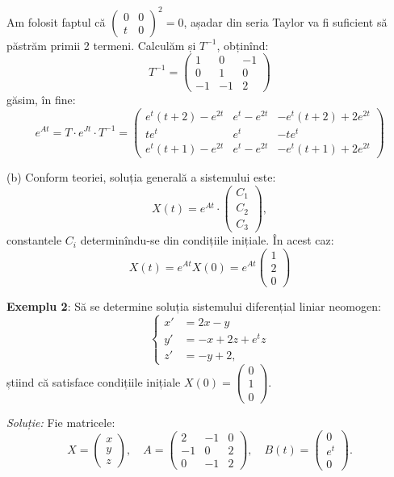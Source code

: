 \documentclass[11pt,a4paper]{article}
\theoremstyle{dotless}
\theoremstyle{dotlessdr}
\begin{document}
Am folosit faptul că $\begin{pmatrix} 0 & 0 \\ t & 0 \end{pmatrix}^2 = 0$, așadar
din seria Taylor va fi suficient să păstrăm primii 2 termeni. Calculăm și $T^{-1}$,
obținînd:
\[
  T^{-1} = \begin{pmatrix}
    1 & 0 & -1 \\
    0 & 1 & 0 \\
    -1 & -1 & 2
  \end{pmatrix}
\]
găsim, în fine:
\[
  e^{At} = T \cdot e^{Jt} \cdot T^{-1} =
  \begin{pmatrix}
    e^t(t + 2) - e^{2t} & e^t - e^{2t} & -e^t(t + 2) + 2e^{2t} \\
    te^t & e^t & -te^t \\
    e^t(t + 1) - e^{2t} & e^t - e^{2t} & -e^t(t + 1) + 2e^{2t}
  \end{pmatrix}
\]

(b) Conform teoriei, soluția generală a sistemului este:
\[
  X(t) = e^{At} \cdot \begin{pmatrix}
    C_1 \\ C_2 \\ C_3
  \end{pmatrix},
\]
constantele $C_i$ determinîndu-se din condițiile inițiale. În acest caz:
\[
  X(t) = e^{At} X(0) = e^{At}
  \begin{pmatrix}
    1 \\ 2 \\ 0 
  \end{pmatrix}
\]

\vspace{2cm}

\textbf{Exemplu 2}: Să se determine soluția sistemului diferențial liniar neomogen:
\[
  \begin{cases}
    x' &= 2x - y \\
    y' &= -x + 2z + e^t z \\
    z' &= -y + 2,
  \end{cases}
\]
știind că satisface condițiile inițiale $X(0) = \begin{pmatrix} 0 \\ 1 \\ 0 \end{pmatrix}$.

\emph{Soluție:} Fie matricele:
\[
  X = \begin{pmatrix}
    x \\ y \\ z 
  \end{pmatrix}, \quad
  A = \begin{pmatrix}
    2 & -1 & 0 \\
    -1 & 0 & 2 \\
    0 & -1 & 2 
  \end{pmatrix}, \quad
  B(t) = \begin{pmatrix}
    0 \\ e^t \\ 0
  \end{pmatrix}.
\]
\end{document}
